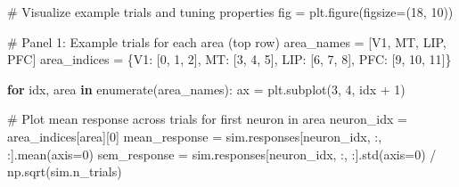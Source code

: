 \documentclass[
  11pt,
  letterpaper,
  oneside,
  openany]{book}
\newenvironment{Shaded}{\begin{snugshade}}{\end{snugshade}}
\newcommand{\BuiltInTok}[1]{\textcolor[rgb]{0.00,0.23,0.31}{#1}}
\newcommand{\CommentTok}[1]{\textcolor[rgb]{0.37,0.37,0.37}{#1}}
\newcommand{\ControlFlowTok}[1]{\textcolor[rgb]{0.00,0.23,0.31}{\textbf{#1}}}
\newcommand{\DecValTok}[1]{\textcolor[rgb]{0.68,0.00,0.00}{#1}}
\newcommand{\KeywordTok}[1]{\textcolor[rgb]{0.00,0.23,0.31}{\textbf{#1}}}
\newcommand{\NormalTok}[1]{\textcolor[rgb]{0.00,0.23,0.31}{#1}}
\newcommand{\OperatorTok}[1]{\textcolor[rgb]{0.37,0.37,0.37}{#1}}
\newcommand{\StringTok}[1]{\textcolor[rgb]{0.13,0.47,0.30}{#1}}
\begin{document}
\begin{Shaded}
\begin{Highlighting}[]
\CommentTok{\# Visualize example trials and tuning properties}
\NormalTok{fig }\OperatorTok{=}\NormalTok{ plt.figure(figsize}\OperatorTok{=}\NormalTok{(}\DecValTok{18}\NormalTok{, }\DecValTok{10}\NormalTok{))}

\CommentTok{\# Panel 1: Example trials for each area (top row)}
\NormalTok{area\_names }\OperatorTok{=}\NormalTok{ [}\StringTok{\textquotesingle{}V1\textquotesingle{}}\NormalTok{, }\StringTok{\textquotesingle{}MT\textquotesingle{}}\NormalTok{, }\StringTok{\textquotesingle{}LIP\textquotesingle{}}\NormalTok{, }\StringTok{\textquotesingle{}PFC\textquotesingle{}}\NormalTok{]}
\NormalTok{area\_indices }\OperatorTok{=}\NormalTok{ \{}\StringTok{\textquotesingle{}V1\textquotesingle{}}\NormalTok{: [}\DecValTok{0}\NormalTok{, }\DecValTok{1}\NormalTok{, }\DecValTok{2}\NormalTok{], }\StringTok{\textquotesingle{}MT\textquotesingle{}}\NormalTok{: [}\DecValTok{3}\NormalTok{, }\DecValTok{4}\NormalTok{, }\DecValTok{5}\NormalTok{], }\StringTok{\textquotesingle{}LIP\textquotesingle{}}\NormalTok{: [}\DecValTok{6}\NormalTok{, }\DecValTok{7}\NormalTok{, }\DecValTok{8}\NormalTok{], }\StringTok{\textquotesingle{}PFC\textquotesingle{}}\NormalTok{: [}\DecValTok{9}\NormalTok{, }\DecValTok{10}\NormalTok{, }\DecValTok{11}\NormalTok{]\}}

\ControlFlowTok{for}\NormalTok{ idx, area }\KeywordTok{in} \BuiltInTok{enumerate}\NormalTok{(area\_names):}
\NormalTok{    ax }\OperatorTok{=}\NormalTok{ plt.subplot(}\DecValTok{3}\NormalTok{, }\DecValTok{4}\NormalTok{, idx }\OperatorTok{+} \DecValTok{1}\NormalTok{)}
    
    \CommentTok{\# Plot mean response across trials for first neuron in area}
\NormalTok{    neuron\_idx }\OperatorTok{=}\NormalTok{ area\_indices[area][}\DecValTok{0}\NormalTok{]}
\NormalTok{    mean\_response }\OperatorTok{=}\NormalTok{ sim.responses[neuron\_idx, :, :].mean(axis}\OperatorTok{=}\DecValTok{0}\NormalTok{)}
\NormalTok{    sem\_response }\OperatorTok{=}\NormalTok{ sim.responses[neuron\_idx, :, :].std(axis}\OperatorTok{=}\DecValTok{0}\NormalTok{) }\OperatorTok{/}\NormalTok{ np.sqrt(sim.n\_trials)}
    

\end{Highlighting}
\end{Shaded}
\end{document}
